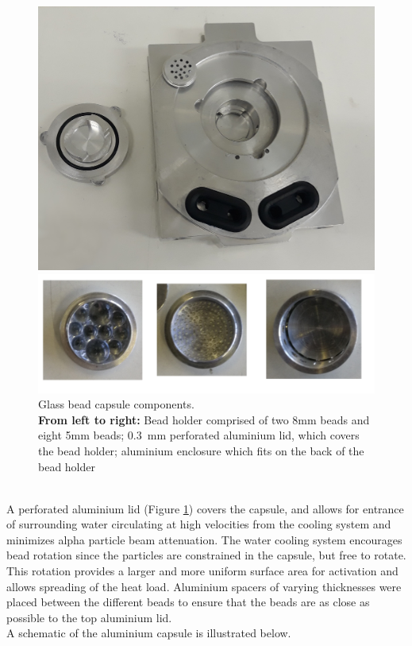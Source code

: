 \documentclass[]{article}
\begin{document}
\begin{figure}[h!]
	\centering
	\begin{minipage}[t]{.4\textwidth}
		\centering
		\includegraphics[width=.7\linewidth]{targetHolder.jpg}
		\captionsetup{justification=centering,margin=1cm}
			\caption{Aluminium target holder (which houses the glass bead capsule - Figure \ref{fig:beadcapsule}) before placement inside the \textit{Elephant} Target Station}
		\label{fig:targetHolder}
	\end{minipage}%
\hspace{1.5cm}
	\begin{minipage}[t]{.5\textwidth}
		\centering
		\includegraphics[width=1\linewidth]{beadcapsule.jpg}
		\captionsetup{justification=centering,margin=0.5cm}
		\caption{Glass bead capsule components.\\ \textbf{From left to right:} Bead holder comprised of two 8mm beads and eight 5mm beads; \SI{0.3}{\milli \metre} perforated aluminium lid, which covers the bead holder; aluminium enclosure which fits on the back of the bead holder}
		\label{fig:beadcapsule}
	\end{minipage}
\end{figure}~\\
A perforated aluminium lid (Figure \ref{fig:beadcapsule}) covers the capsule, and allows for entrance of surrounding water circulating at high velocities from the cooling system and minimizes alpha particle beam attenuation. The water cooling system encourages bead rotation since the particles are constrained in the capsule, but free to rotate. This rotation provides a larger and more uniform surface area for activation and allows spreading of the heat load. Aluminium spacers of varying thicknesses were placed between the different beads to ensure that the beads are as close as possible to the top aluminium lid.\pagebreak \\  A schematic of the aluminium capsule is illustrated below. 
\end{document}
